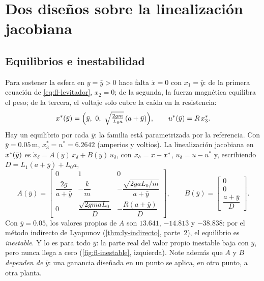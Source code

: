 \section{Dos diseños sobre la linealización jacobiana}
\label{sec:fl-jacobiana}

\subsection{Equilibrios e inestabilidad}

Para sostener la esfera en $y=\bar y>0$ hace falta $\dot x=0$ con $x_1=\bar y$: de la primera ecuación de \eqref{eq:fl-levitador}, $x_2=0$; de la segunda, la fuerza magnética equilibra el peso; de la tercera, el voltaje solo cubre la caída en la resistencia:
\begin{equation}
  \eq(\bar y)=\Bigl(\bar y,\ 0,\ \sqrt{\tfrac{2gm}{L_0a}}\,(a+\bar y)\Bigr),
  \qquad
  u^*(\bar y)=R\,x_3^* .
  \label{eq:fl-equilibrio}
\end{equation}
Hay un equilibrio por cada $\bar y$: la familia está parametrizada por la referencia. Con $\bar y=0.05$\,m, $x_3^*=u^*=6.2642$ (amperios y voltios). La linealización jacobiana en $x^{*}(\bar y)$ es $\dot x_\delta=A(\bar y)\,x_\delta+B(\bar y)\,u_\delta$, con $x_\delta=x-x^{*}$, $u_\delta=u-u^*$ y, escribiendo $D=L_1(a+\bar y)+L_0a$,
\begin{equation}
  A(\bar y)=\begin{bmatrix}0&1&0\\[2pt] \dfrac{2g}{a+\bar y}&-\dfrac km&-\dfrac{\sqrt{2gaL_0/m}}{a+\bar y}\\[8pt] 0&\dfrac{\sqrt{2gmaL_0}}{D}&-\dfrac{R(a+\bar y)}{D}\end{bmatrix},
  \qquad
  B(\bar y)=\begin{bmatrix}0\\0\\ \dfrac{a+\bar y}{D}\end{bmatrix}.
  \label{eq:fl-AB}
\end{equation}
Con $\bar y=0.05$, los valores propios de $A$ son $13.641$, $-14.813$ y $-38.838$: por el método indirecto de Lyapunov (\cref{thm:ly-indirecto}, parte~2), el equilibrio es \emph{inestable}. Y lo es para todo $\bar y$: la parte real del valor propio inestable baja con $\bar y$, pero nunca llega a cero (\cref{fig:fl-inestable}, izquierda). Note además que $A$ y $B$ \emph{dependen de} $\bar y$: una ganancia diseñada en un punto se aplica, en otro punto, a otra planta.

